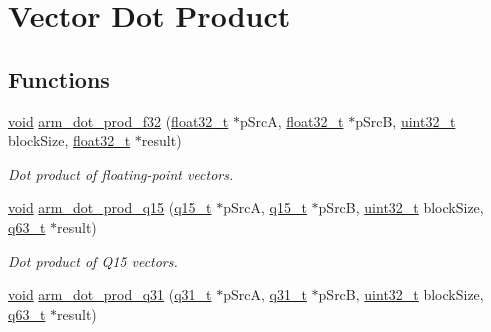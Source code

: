 \hypertarget{group__dot__prod}{\section{Vector Dot Product}
\label{group__dot__prod}
}
\subsection*{Functions}
\begin{DoxyCompactItemize}
\item 
\hyperlink{group___n_a_m_e_ga18028b8badbf1ea7e704ccac3c488e82}{void} \hyperlink{group__dot__prod_ga55418d4362f6ba84c327f9b4f089a8c3}{arm\-\_\-dot\-\_\-prod\-\_\-f32} (\hyperlink{arm__math_8h_a4611b605e45ab401f02cab15c5e38715}{float32\-\_\-t} $\ast$p\-Src\-A, \hyperlink{arm__math_8h_a4611b605e45ab401f02cab15c5e38715}{float32\-\_\-t} $\ast$p\-Src\-B, \hyperlink{stdint_8h_a435d1572bf3f880d55459d9805097f62}{uint32\-\_\-t} block\-Size, \hyperlink{arm__math_8h_a4611b605e45ab401f02cab15c5e38715}{float32\-\_\-t} $\ast$result)
\begin{DoxyCompactList}\small\item\em Dot product of floating-\/point vectors. \end{DoxyCompactList}\item 
\hyperlink{group___n_a_m_e_ga18028b8badbf1ea7e704ccac3c488e82}{void} \hyperlink{group__dot__prod_ga436d5bed28a4b73b24acbde436a3044b}{arm\-\_\-dot\-\_\-prod\-\_\-q15} (\hyperlink{arm__math_8h_ab5a8fb21a5b3b983d5f54f31614052ea}{q15\-\_\-t} $\ast$p\-Src\-A, \hyperlink{arm__math_8h_ab5a8fb21a5b3b983d5f54f31614052ea}{q15\-\_\-t} $\ast$p\-Src\-B, \hyperlink{stdint_8h_a435d1572bf3f880d55459d9805097f62}{uint32\-\_\-t} block\-Size, \hyperlink{arm__math_8h_a5aea1cb12fc02d9d44c8abf217eaa5c6}{q63\-\_\-t} $\ast$result)
\begin{DoxyCompactList}\small\item\em Dot product of Q15 vectors. \end{DoxyCompactList}\item 
\hyperlink{group___n_a_m_e_ga18028b8badbf1ea7e704ccac3c488e82}{void} \hyperlink{group__dot__prod_gab15d8fa060fc85b4d948d091b7deaa11}{arm\-\_\-dot\-\_\-prod\-\_\-q31} (\hyperlink{arm__math_8h_adc89a3547f5324b7b3b95adec3806bc0}{q31\-\_\-t} $\ast$p\-Src\-A, \hyperlink{arm__math_8h_adc89a3547f5324b7b3b95adec3806bc0}{q31\-\_\-t} $\ast$p\-Src\-B, \hyperlink{stdint_8h_a435d1572bf3f880d55459d9805097f62}{uint32\-\_\-t} block\-Size, \hyperlink{arm__math_8h_a5aea1cb12fc02d9d44c8abf217eaa5c6}{q63\-\_\-t} $\ast$result)

\end{DoxyCompactItemize}
